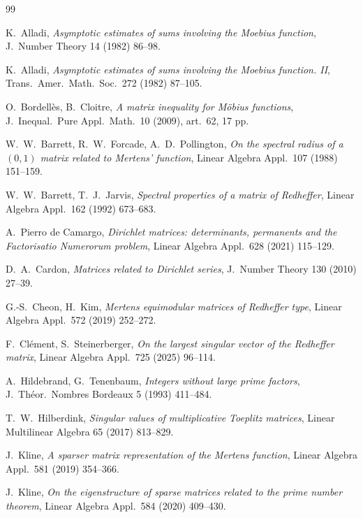 \documentclass[11pt]{article}
\theoremstyle{definition}
\theoremstyle{remark}
\begin{document}
\begin{thebibliography}{99}

K.~Alladi, \emph{Asymptotic estimates of sums involving the Moebius function},
J.\ Number Theory 14 (1982) 86--98.

K.~Alladi, \emph{Asymptotic estimates of sums involving the Moebius function.
II}, Trans.\ Amer.\ Math.\ Soc.\ 272 (1982) 87--105.

O.~Bordell\`es, B.~Cloitre, \emph{A matrix inequality for M\"obius functions},
J.\ Inequal.\ Pure Appl.\ Math.\ 10 (2009), art.\ 62, 17 pp.

W.~W.~Barrett, R.~W.~Forcade, A.~D.~Pollington, \emph{On the spectral radius of a
$(0,1)$ matrix related to Mertens' function}, Linear Algebra Appl.\ 107 (1988)
151--159.

W.~W.~Barrett, T.~J.~Jarvis, \emph{Spectral properties of a matrix of Redheffer},
Linear Algebra Appl.\ 162 (1992) 673--683.

A.~Pierro de Camargo, \emph{Dirichlet matrices: determinants, permanents and the
Factorisatio Numerorum problem}, Linear Algebra Appl.\ 628 (2021) 115--129.

D.~A.~Cardon, \emph{Matrices related to Dirichlet series}, J.\ Number Theory 130
(2010) 27--39.

G.-S.~Cheon, H.~Kim, \emph{Mertens equimodular matrices of Redheffer type},
Linear Algebra Appl.\ 572 (2019) 252--272.

F.~Cl\'ement, S.~Steinerberger, \emph{On the largest singular vector of the
Redheffer matrix}, Linear Algebra Appl.\ 725 (2025) 96--114.

A.~Hildebrand, G.~Tenenbaum, \emph{Integers without large prime factors},
J.\ Th\'eor.\ Nombres Bordeaux 5 (1993) 411--484.

T.~W.~Hilberdink, \emph{Singular values of multiplicative Toeplitz matrices},
Linear Multilinear Algebra 65 (2017) 813--829.

J.~Kline, \emph{A sparser matrix representation of the Mertens function}, Linear
Algebra Appl.\ 581 (2019) 354--366.

J.~Kline, \emph{On the eigenstructure of sparse matrices related to the prime
number theorem}, Linear Algebra Appl.\ 584 (2020) 409--430.


\end{thebibliography}
\end{document}
